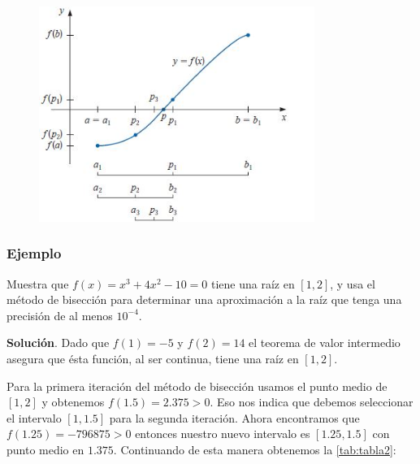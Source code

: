 \begin{figure}[!h]
 \begin{center}
    \includegraphics[width=0.8\textwidth]{Biseccion.JPG}
 \end{center}
\end{figure} 

\subsubsection*{Ejemplo}
Muestra que $f(x)=x^3+4x^2-10=0$ tiene una raíz en $[1,2]$, y usa el método de bisección para determinar una aproximación a la raíz que tenga una precisión de al menos $10^{-4}$.

\textbf{Solución}. Dado que $f(1)=-5$ y $f(2)=14$ el teorema de valor intermedio asegura que ésta función, al ser continua, tiene una raíz en $[1,2]$.

Para la primera iteración del método de bisección usamos el punto medio de $[1,2]$ y obtenemos $f(1.5)=2.375>0$. Eso nos indica que debemos seleccionar el intervalo $[1,1.5]$ para la segunda iteración. Ahora encontramos que $f(1.25)=-796875>0$ entonces nuestro nuevo intervalo es $[1.25,1.5]$ con punto medio en $1.375$. Continuando de esta manera obtenemos la \ref{tab:tabla2}:

